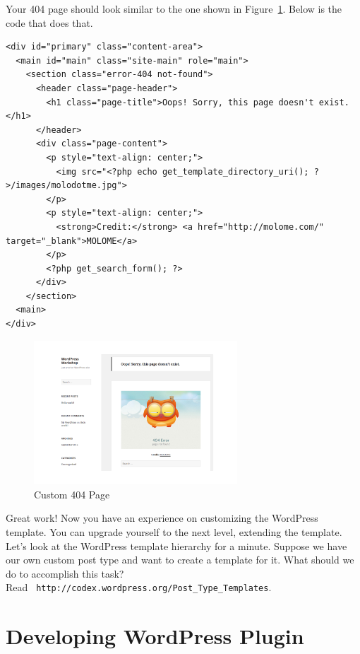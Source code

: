 \documentclass{article}
\begin{document}
\noindent Your 404 page should look similar to the one shown in
Figure~\ref{fig:custom-404-page}. Below is the code that does that.

\begin{verbatim}
<div id="primary" class="content-area">
  <main id="main" class="site-main" role="main">
    <section class="error-404 not-found">
      <header class="page-header">
        <h1 class="page-title">Oops! Sorry, this page doesn't exist.</h1>
      </header>
      <div class="page-content">
        <p style="text-align: center;">
          <img src="<?php echo get_template_directory_uri(); ?>/images/molodotme.jpg">
        </p>
        <p style="text-align: center;">
          <strong>Credit:</strong> <a href="http://molome.com/" target="_blank">MOLOME</a>
        </p>
        <?php get_search_form(); ?>
      </div>
    </section>
  <main>
</div>
\end{verbatim}

\begin{figure}[t]
    \centering
    \includegraphics[width=3in]{figures/custom-404-page}
    \caption{Custom 404 Page}
    \label{fig:custom-404-page}
\end{figure}

\noindent Great work! Now you have an experience on customizing the WordPress
template. You can upgrade yourself to the next level, extending the template.
\\

 Let's look at the WordPress template hierarchy for a
minute. Suppose we have our own custom post type and want to create a template
for it. What should we do to accomplish this task? \\

 Read {\tt
http://codex.wordpress.org/Post\_Type\_Templates}.

\section*{Developing WordPress Plugin}
\end{document}
